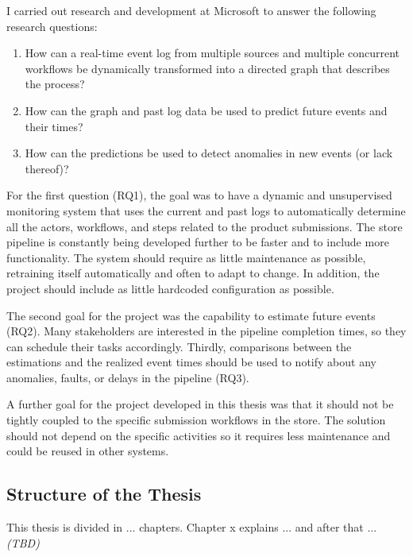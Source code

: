 \documentclass[english,12pt,a4paper,pdftex,sci,utf8]{aaltothesis}
\theoremstyle{definition}
\newcommand{\nyi}[1]{\noindent\colorbox{nyibg}{\textcolor{nyitext}{\emph{#1}}}}
\begin{document}
I carried out research and development at Microsoft to answer the following research questions:

\begin{enumerate}[label=RQ\arabic*]
    \item How can a real-time event log from multiple sources and multiple concurrent workflows be dynamically transformed into a directed graph that describes the process? 
    \item How can the graph and past log data be used to predict future events and their times?
    \item How can the predictions be used to detect anomalies in new events (or lack thereof)?
\end{enumerate}

For the first question (RQ1), the goal was to have a dynamic and unsupervised monitoring system 
that uses the current and past logs to automatically determine all the actors, 
workflows, and steps related to the product submissions.
The store pipeline is constantly being developed further to be faster and to include more functionality.
The system should require as little maintenance as possible, retraining itself automatically and often to adapt to change.
In addition, the project should include as little hardcoded configuration as possible.

The second goal for the project was the capability to estimate future events (RQ2). 
Many stakeholders are interested in the pipeline completion times, so they can schedule their tasks accordingly.
Thirdly, comparisons between the estimations and the realized event times should be used to notify 
about any anomalies, faults, or delays in the pipeline (RQ3).

A further goal for the project developed in this thesis was that it should not be tightly coupled to the 
specific submission workflows in the store. The solution should not depend on the specific activities so
it requires less maintenance and could be reused in other systems.

\subsection{Structure of the Thesis}
This thesis is divided in ... chapters. Chapter x explains ... and after that ... 
\nyi{(TBD)}

\end{document}
